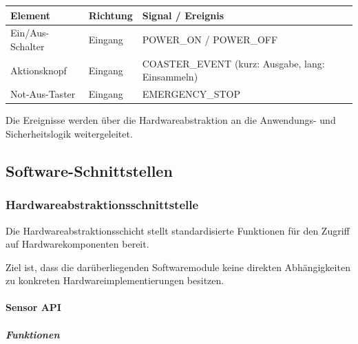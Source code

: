 \begin{longtable}[]{@{}
  >{\raggedright\arraybackslash}p{}
  >{\raggedright\arraybackslash}p{}
  >{\raggedright\arraybackslash}p{}@{}}
\toprule\noalign{}
\begin{minipage}[b]{\linewidth}\raggedright
Element
\end{minipage} & \begin{minipage}[b]{\linewidth}\raggedright
Richtung
\end{minipage} & \begin{minipage}[b]{\linewidth}\raggedright
Signal / Ereignis
\end{minipage} \\
\midrule\noalign{}
\endhead
\bottomrule\noalign{}
\endlastfoot
Ein/Aus-Schalter & Eingang & POWER\_ON / POWER\_OFF \\
Aktionsknopf & Eingang & COASTER\_EVENT (kurz: Ausgabe, lang:
Einsammeln) \\
Not-Aus-Taster & Eingang & EMERGENCY\_STOP \\
\end{longtable}

Die Ereignisse werden über die Hardwareabstraktion an die Anwendungs-
und Sicherheitslogik weitergeleitet.

\subsection{Software-Schnittstellen}\label{software-schnittstellen}

\subsubsection{Hardwareabstraktionsschnittstelle}\label{hardwareabstraktionsschnittstelle}

Die Hardwareabstraktionsschicht stellt standardisierte Funktionen für
den Zugriff auf Hardwarekomponenten bereit.

Ziel ist, dass die darüberliegenden Softwaremodule keine direkten
Abhängigkeiten zu konkreten Hardwareimplementierungen besitzen.

\paragraph{Sensor API}\label{sensor-api}

\subparagraph{Funktionen}\label{funktionen-5}

